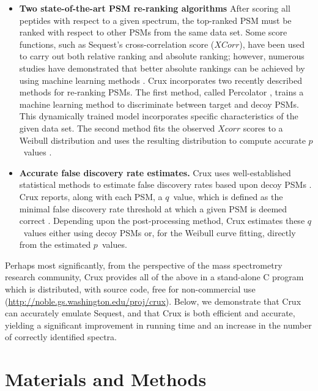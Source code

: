\documentclass[12pt]{article}
\begin{document}
\begin{itemize}
\item {\bf Two state-of-the-art PSM re-ranking algorithms} After
  scoring all peptides with respect to a given spectrum, the
  top-ranked PSM must be ranked with respect to other PSMs from the
  same data set.  Some score functions, such as {\sc Sequest}'s
  cross-correlation score ($XCorr$), have been used to carry out both
  relative ranking and absolute ranking; however, numerous studies
  have demonstrated that better absolute rankings can be achieved by
  using machine learning methods \cite{keller:empirical, anderson:new,
  elias:intensity, kall:semi-supervised}.  Crux incorporates two
  recently described methods for re-ranking PSMs.  The first method,
  called Percolator \cite{kall:semi-supervised}, trains a machine
  learning method to discriminate between target and decoy PSMs.  This
  dynamically trained model incorporates specific characteristics of
  the given data set.  The second method fits the observed $Xcorr$
  scores to a Weibull distribution and uses the resulting distribution
  to compute accurate $p$~values \cite{klammer:not}.

\item {\bf Accurate false discovery rate estimates.}  Crux uses
  well-established statistical methods to estimate false discovery
  rates based upon decoy PSMs \cite{benjamini:controlling}.  Crux
  reports, along with each PSM, a $q$~value, which is defined as the
  minimal false discovery rate threshold at which a given PSM is
  deemed correct \cite{storey:statistical}.  Depending upon the
  post-processing method, Crux estimates these $q$~values either using
  decoy PSMs or, for the Weibull curve fitting, directly from the
  estimated $p$~values.

\end{itemize}

Perhaps most significantly, from the perspective of the mass
spectrometry research community, Crux provides all of the above in a
stand-alone C program which is distributed, with source code, free for
non-commercial use (\url{http://noble.gs.washington.edu/proj/crux}).
Below, we demonstrate that Crux can accurately emulate {\sc Sequest},
and that Crux is both efficient and accurate, yielding a significant
improvement in running time and an increase in the number of correctly
identified spectra.

\section{Materials and Methods}
\end{document}
